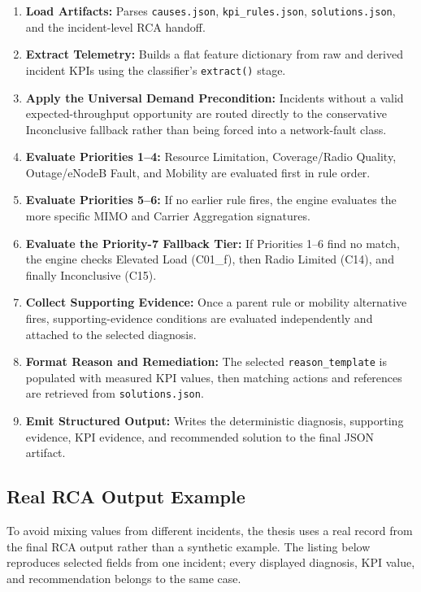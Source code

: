 \begin{enumerate}
\item \textbf{Load Artifacts:} Parses \texttt{causes.json}, \texttt{kpi\_rules.json}, \texttt{solutions.json}, and the incident-level RCA handoff.
\item \textbf{Extract Telemetry:} Builds a flat feature dictionary from raw and derived incident KPIs using the classifier's \texttt{extract()} stage.
\item \textbf{Apply the Universal Demand Precondition:} Incidents without a valid expected-throughput opportunity are routed directly to the conservative Inconclusive fallback rather than being forced into a network-fault class.
\item \textbf{Evaluate Priorities 1--4:} Resource Limitation, Coverage/Radio Quality, Outage/eNodeB Fault, and Mobility are evaluated first in rule order.
\item \textbf{Evaluate Priorities 5--6:} If no earlier rule fires, the engine evaluates the more specific MIMO and Carrier Aggregation signatures.
\item \textbf{Evaluate the Priority-7 Fallback Tier:} If Priorities 1--6 find no match, the engine checks Elevated Load (C01\_f), then Radio Limited (C14), and finally Inconclusive (C15).
\item \textbf{Collect Supporting Evidence:} Once a parent rule or mobility alternative fires, supporting-evidence conditions are evaluated independently and attached to the selected diagnosis.
\item \textbf{Format Reason and Remediation:} The selected \texttt{reason\_template} is populated with measured KPI values, then matching actions and references are retrieved from \texttt{solutions.json}.
\item \textbf{Emit Structured Output:} Writes the deterministic diagnosis, supporting evidence, KPI evidence, and recommended solution to the final JSON artifact.
\end{enumerate}

\subsection{Real RCA Output Example}

To avoid mixing values from different incidents, the thesis uses a real record from the final RCA output rather than a synthetic example. The listing below reproduces selected fields from one incident; every displayed diagnosis, KPI value, and recommendation belongs to the same case.

